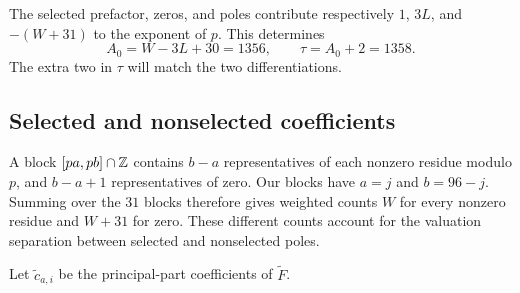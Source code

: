 The selected prefactor, zeros, and poles contribute respectively
$1$, $3L$, and $-(W+31)$ to the exponent of $p$. This determines
\begin{equation}\label{eq:A0}
 A_0=W-3L+30=1356,\qquad \tau=A_0+2=1358.
\end{equation}
The extra two in $\tau$ will match the two differentiations.

\subsection{Selected and nonselected coefficients}
A block $[pa,pb]\cap\mathbb Z$ contains $b-a$ representatives of each
nonzero residue modulo $p$, and $b-a+1$ representatives of zero.
Our blocks have $a=j$ and $b=96-j$. Summing over the $31$ blocks
therefore gives weighted counts $W$ for every nonzero residue and
$W+31$ for zero. These different counts account for the valuation
separation between selected and nonselected poles.

Let $\widetilde c_{a,i}$ be the principal-part coefficients of
$\widetilde F$.

